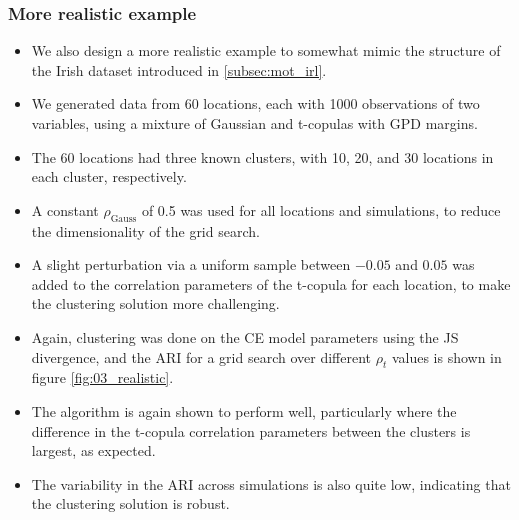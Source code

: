 \documentclass{article}
\numberwithin{equation}{section}
\begin{document}
\subsubsection{More realistic example} \label{subsubsec:sim_realistic}


\begin{itemize}
  \item We also design a more realistic example to somewhat mimic the structure of the Irish dataset introduced in \ref{subsec:mot_irl}.
  \item We generated data from 60 locations, each with 1000 observations of two variables, using a mixture of Gaussian and t-copulas with GPD margins.
  \item The 60 locations had three known clusters, with 10, 20, and 30 locations in each cluster, respectively.
  \item A constant $\rho_{\text{Gauss}}$ of 0.5 was used for all locations and simulations, to reduce the dimensionality of the grid search.
  \item A slight perturbation via a uniform sample between $-0.05$ and $0.05$ was added to the correlation parameters of the t-copula for each location, to make the clustering solution more challenging.
  \item Again, clustering was done on the CE model parameters using the JS divergence, and the ARI for a grid search over different $\rho_t$ values is shown in figure \ref{fig:03_realistic}.
  \item The algorithm is again shown to perform well, particularly where the difference in the t-copula correlation parameters between the clusters is largest, as expected.
  \item The variability in the ARI across simulations is also quite low, indicating that the clustering solution is robust.
\end{itemize}
\end{document}
